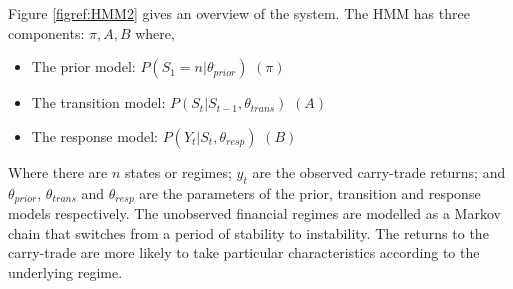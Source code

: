 \documentclass[12pt, a4paper, oneside]{article}\usepackage[]{graphicx}\usepackage[]{color}
\begin{document}
Figure \ref{figref:HMM2} gives an overview of the system.  The HMM has three components: $\pi, A, B$ where,

\begin{itemize}
\item The prior model: $P(S_1 = n| \theta_{prior})$ $(\pi)$
\item The transition model: $P(S_t| S_{t-1}, \theta_{trans})$ $(A)$
\item The response model: $P(Y_t| S_t, \theta_{resp})$ $(B)$
\end{itemize}

Where there are $n$ states or regimes; $y_t$ are the observed carry-trade returns; and $\theta_{prior}$, $\theta_{trans}$ and  $\theta_{resp}$ are the parameters of the prior, transition and response models respectively. The unobserved financial regimes are modelled as a Markov chain that switches from a period of stability to instability.  The returns to the carry-trade are more likely to take particular characteristics according to the underlying regime.   
\end{document}
